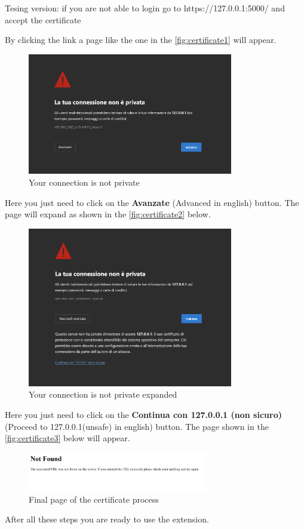 \begin{warning}
	Tesing version: if you are not able to login go to https://127.0.0.1:5000/ and accept the certificate
\end{warning}
By clicking the link a page like the one in the \autoref{fig:certificate1}  will appear. 

\begin{figure}[htb]
	\centering
	\includegraphics[width=0.8\textwidth]{images/extension/certificate1.png}
	\caption{Your connection is not private}
	\label{fig:certificate1}
\end{figure}
Here you just need to click on the \textbf{Avanzate} (Advanced in english) button. The page will expand as shown in the \autoref{fig:certificate2} below.
\begin{figure}[htb]
	\centering
	\includegraphics[width=0.8\textwidth]{images/extension/certificate2.png}
	\caption{Your connection is not private expanded}
	\label{fig:certificate2}
\end{figure}
Here you just need to click on the \textbf{Continua con 127.0.0.1 (non sicuro)} (Proceed to 127.0.0.1(unsafe) in english) button. The page shown in the \autoref{fig:certificate3} below will appear.
\begin{figure}[htb]
	\centering
	\includegraphics[width=0.7\textwidth]{images/extension/certificate3.png}
	\caption{Final page of the certificate process}
	\label{fig:certificate3}
\end{figure}
After all these steps you are ready to use the extension.


